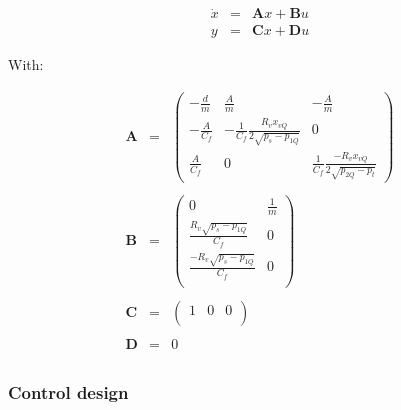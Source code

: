 $$ \begin{array}{rcl}
    \dot{x} & = &  \bm{A}x + \bm{B}u \\
    y & = & \bm{C}x + \bm{D}u
   \end{array}$$
   
With:

$$\begin{array}{rcl}
   \bm{A} & = & \left(\begin{array}{ccc} 
   -\frac{d}{m} & \frac{A}{m} & -\frac{A}{m} \\ 
   -\frac{A}{C_f} & -\frac{1}{C_f} \frac{R_v x_{vQ}}{2\sqrt{p_s - p_{1Q}}} & 0 \\ 
   \frac{A}{C_f} & 0 & \frac{1}{C_f} \frac{-R_v x_{vQ}}{2 \sqrt{p_{2Q}-p_t}}
   \end{array}\right) \\ \\
   
   \bm{B} & = & \left(\begin{array}{cc}
   0 & \frac{1}{m} \\
   \frac{R_v \sqrt{p_s - p_{1Q}}}{C_f} & 0 \\
   \frac{-R_v \sqrt{p_s - p_{1Q}}}{C_f} & 0 \\
   \end{array}\right) \\ \\
   
   \bm{C} & = & \left(\begin{array}{ccc}
   1 & 0 & 0\\
   \end{array}\right) \\ \\
   
   \bm{D} & = & 0 \\
  \end{array}$$

  
\subsubsection*{Control design}

